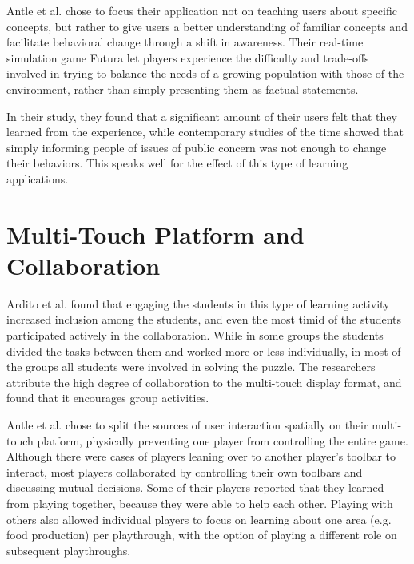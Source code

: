 Antle et al.\citep{AntleFutura} chose to focus their application not on teaching users about specific concepts, but rather to give users a better understanding of familiar concepts and facilitate behavioral change through a shift in awareness. Their real-time simulation game Futura let players experience the difficulty and trade-offs involved in trying to balance the needs of a growing population with those of the environment, rather than simply presenting them as factual statements.

In their study, they found that a significant amount of their users felt that they learned from the experience, while contemporary studies of the time showed that simply informing people of issues of public concern was not enough to change their behaviors. This speaks well for the effect of this type of learning applications.


\section{Multi-Touch Platform and Collaboration}

Ardito et al. found that engaging the students in this type of learning activity increased inclusion among the students, and even the most timid of the students participated actively in the collaboration. While in some groups the students divided the tasks between them and worked more or less individually, in most of the groups all students were involved in solving the puzzle. The researchers attribute the high degree of collaboration to the multi-touch display format, and found that it encourages group activities.

Antle et al. chose to split the sources of user interaction spatially on their multi-touch platform, physically preventing one player from controlling the entire game. Although there were cases of players leaning over to another player's toolbar to interact, most players collaborated by controlling their own toolbars and discussing mutual decisions. Some of their players reported that they learned from playing together, because they were able to help each other. Playing with others also allowed individual players to focus on learning about one area (e.g. food production) per playthrough, with the option of playing a different role on subsequent playthroughs.




